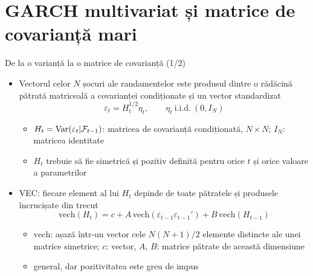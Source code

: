 \section{GARCH multivariat și matrice de covarianță mari}

\begin{frame}{De la o varianță la o matrice de covarianță (1/2)}
\itemsize{\small}
\begin{itemize}
    \item Vectorul celor $N$ șocuri ale randamentelor este produsul dintre o rădăcină pătrată matriceală a covarianței condiționate și un vector standardizat
    \[ \varepsilon_t = H_t^{1/2}\eta_t, \qquad \eta_t \ \text{i.i.d.}\ (0, I_N) \]
    \begin{itemize}
        \item $H_t = \text{Var}(\varepsilon_t | \mathcal F_{t-1})$: matricea de covarianță condiționată, $N \times N$; $I_N$: matricea identitate
        \item $H_t$ trebuie să fie simetrică și pozitiv definită pentru orice $t$ și orice valoare a parametrilor
    \end{itemize}
    \item VEC: fiecare element al lui $H_t$ depinde de toate pătratele și produsele încrucișate din trecut
    \[ \mathrm{vech}(H_t) = c + A\,\mathrm{vech}(\varepsilon_{t-1}\varepsilon_{t-1}') + B\,\mathrm{vech}(H_{t-1}) \]
    \begin{itemize}
        \item $\mathrm{vech}$: așază într-un vector cele $N(N+1)/2$ elemente distincte ale unei matrice simetrice; $c$: vector, $A$, $B$: matrice pătrate de această dimensiune
        \item general, dar pozitivitatea este greu de impus
    \end{itemize}
\end{itemize}
\end{frame}


